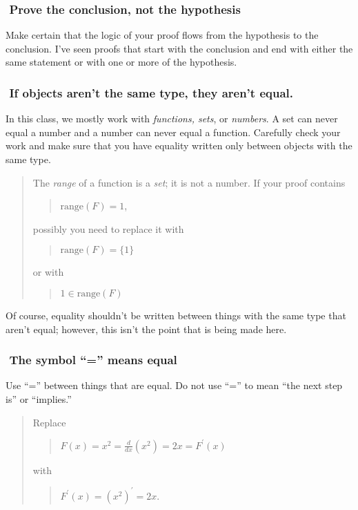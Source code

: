 \documentclass[12pt,fleqn]{article}
\newcounter{ex}\setcounter{ex}{0}
\newcommand{\ex}{%
\hspace{-0.2in} \setcounter{ex}{\value{ex}+1}
\theex \,\,}
\newcounter{se}\setcounter{se}{0}
\begin{document}
\subsubsection*{\ex Prove the conclusion, not the hypothesis}

Make certain that the logic of your proof flows from the 
hypothesis to the conclusion. I've seen proofs that
start with the conclusion and end with either the same statement
or with one or more of the hypothesis.  



\subsubsection*{\ex If objects aren't the same type, they aren't
  equal.}

In this class, we mostly work with {\em functions, sets}, or {\em
numbers\/}.  A set can never equal a number and a number can never
equal a function.  Carefully check your work and make sure that you
have equality written only between objects with the same type.
\begin{quote}
The {\em range\/} of a function is a {\em set\/}; it is not a
number. If your proof contains
\begin{quote}
 \(\mbox{range}(F) = 1\),
\end{quote}
possibly you need to replace it with
\begin{quote}
 \(\mbox{range}(F) = \{1\}\)
\end{quote}
or with
\begin{quote}
 \(1 \in \mbox{range}(F)\)
\end{quote}
\end{quote}
Of course, equality shouldn't be written between things with the
same type that aren't equal; however, this isn't the point that 
is being made here.


\subsubsection*{\ex The symbol ``='' means equal}

Use ``='' between things that are equal. Do not use ``='' to 
mean ``the next step is'' or ``implies.''

\begin{quote}
Replace
\begin{quote}
  \(\displaystyle F(x) = x^2 = \frac{d}{dx} (x^2) = 2x = F^\prime(x)\)
\end{quote}
with
\begin{quote}
  \(F^\prime(x) = (x^2)^\prime = 2 x. \)
\end{quote}
\end{quote}
\end{document}
